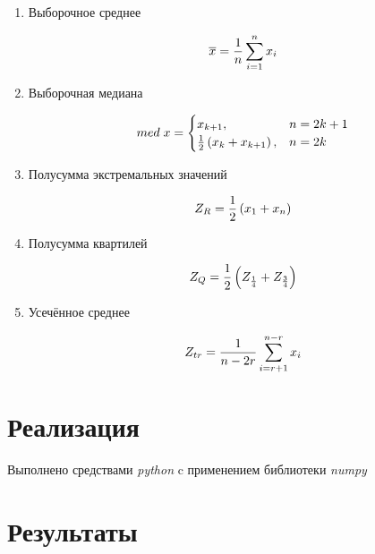 \documentclass[12pt]{report}
\begin{document}
\begin{enumerate}

\item{Выборочное среднее \cite{average}}

\begin{equation}
\overline{x} = \frac{1}{n}\sum_{i=1}^n x_i \hfill \label{eqn:average}
\end{equation}

\item{Выборочная медиана \cite{med}}

\begin{equation}
med\; x = \begin{cases}
x_{k+1}, & n = 2k+1\\
\frac{1}{2}\left(x_k+x_{k+1}\right), & n = 2k
\end{cases} \hfill  \label{eqn:med}
\end{equation}

\item{Полусумма экстремальных значений \cite{mean_extr}}

\begin{equation} 
Z_R = \frac{1}{2}\left(x_1+x_n\right) \hfill  \label{eqn:mean_extr}
\end{equation}

\item{Полусумма квартилей \cite{quartiles}}

\begin{equation}
Z_Q = \frac{1}{2}\left(Z_{\frac{1}{4}}+Z_{\frac{3}{4}}\right) \hfill  
\label{eqn:quartiles}
\end{equation}

\item{Усечённое среднее \cite{cut_mean}}

\begin{equation}
Z_{tr} = \frac{1}{n - 2r}\sum_{i=r+1}^{n-r} x_i \hfill  \label{eqn:cut_mean}
\end{equation}

\end{enumerate}

\section{Реализация}
Выполнено средствами \textit{python} c применением библиотеки \textit{numpy}\cite{numpy}

\section{Результаты}
\end{document}
